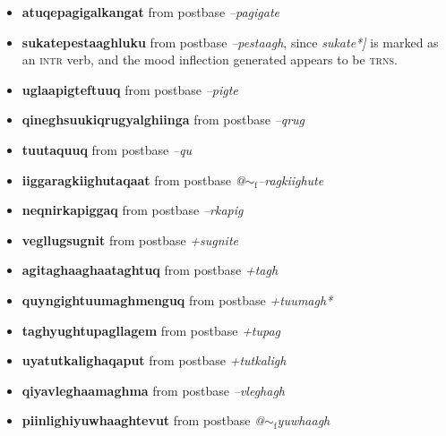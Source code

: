 \documentclass{article}
\begin{document}
\begin{itemize}
\item \textbf{atuqepagigalkangat} from postbase \textit{--pagigate}

\item \textbf{sukatepestaaghluku} from postbase \textit{--pestaagh}, since \textit{sukate*]} is marked as an \textsc{intr} verb, and the mood inflection generated appears to be \textsc{trns}.

\item \textbf{uglaapigteftuuq} from postbase \textit{--pigte}

\item \textbf{qineghsuukiqrugyalghiinga} from postbase \textit{--qrug}

\item \textbf{tuutaquuq} from postbase \textit{--qu}

\item \textbf{iiggaragkiighutaqaat} from postbase \textit{@$\sim_\text{f}$--ragkiighute}

\item \textbf{neqnirkapiggaq} from postbase \textit{--rkapig}

\item \textbf{vegllugsugnit} from postbase \textit{+sugnite}

\item \textbf{agitaghaaghaataghtuq} from postbase \textit{+tagh}

\item \textbf{quyngightuumaghmenguq} from postbase \textit{+tuumagh*}

\item \textbf{taghyughtupagllagem} from postbase \textit{+tupag}

\item \textbf{uyatutkalighaqaput} from postbase \textit{+tutkaligh}

\item \textbf{qiyavleghaamaghma} from postbase \textit{--vleghagh}

\item \textbf{piinlighiyuwhaaghtevut} from postbase \textit{@$\sim_\text{f}$yuwhaagh}
\end{itemize}
\end{document}
